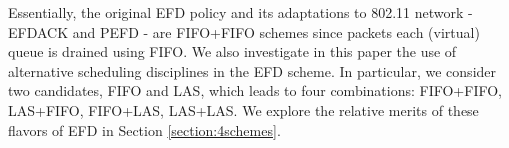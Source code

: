 \documentclass[preprint,12pt]{elsarticle}
\begin{document}




Essentially, the original EFD policy and its adaptations to 802.11 network - EFDACK and PEFD - are FIFO+FIFO schemes since packets  each (virtual) queue is drained using  FIFO. We also investigate in this paper the use of alternative scheduling disciplines in the EFD scheme. In particular, we consider two candidates, FIFO and LAS, which leads to four combinations: FIFO+FIFO, LAS+FIFO, FIFO+LAS, LAS+LAS. We explore the relative merits of these flavors of EFD in Section \ref{section:4schemes}.
\end{document}
